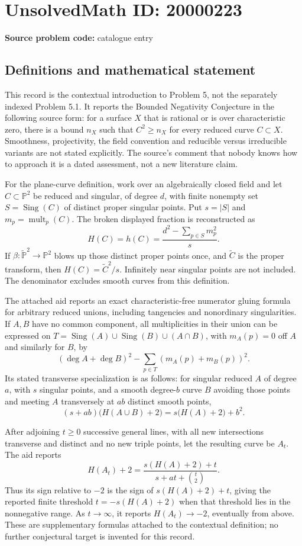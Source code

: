 \documentclass[11pt]{article}
\newcommand{\PP}{\mathbb{P}}
\begin{document}
\section*{UnsolvedMath ID: 20000223}
\textbf{Source problem code:} catalogue entry
\subsection{Definitions and mathematical statement}
This record is the contextual introduction to Problem 5, not the separately indexed Problem 5.1. It reports the Bounded Negativity Conjecture in the following source form: for a surface \(X\) that is rational or is over characteristic zero, there is a bound \(n_X\) such that \(C^2\geq n_X\) for every reduced curve \(C\subset X\). Smoothness, projectivity, the field convention and reducible versus irreducible variants are not stated explicitly. The source's comment that nobody knows how to approach it is a dated assessment, not a new literature claim.

For the plane-curve definition, work over an algebraically closed field and let \(C\subset\PP^2\) be reduced and singular, of degree \(d\), with finite nonempty set \(S=\operatorname{Sing}(C)\) of distinct proper singular points. Put \(s=|S|\) and \(m_p=\operatorname{mult}_p(C)\). The broken displayed fraction is reconstructed as
\[
H(C)=h(C)=\frac{d^2-\sum_{p\in S}m_p^2}{s}.
\]
If \(\beta:\widetilde{\PP}^2\to\PP^2\) blows up those distinct proper points once, and \(\widetilde C\) is the proper transform, then \(H(C)=\widetilde C^2/s\). Infinitely near singular points are not included. The denominator excludes smooth curves from this definition.

The attached aid reports an exact characteristic-free numerator gluing formula for arbitrary reduced unions, including tangencies and nonordinary singularities. If \(A,B\) have no common component, all multiplicities in their union can be expressed on
\(T=\operatorname{Sing}(A)\cup\operatorname{Sing}(B)\cup(A\cap B)\), with \(m_A(p)=0\) off \(A\) and similarly for \(B\), by
\[
(\deg A+\deg B)^2-\sum_{p\in T}(m_A(p)+m_B(p))^2.
\]
Its stated transverse specialization is as follows: for singular reduced \(A\) of degree \(a\), with \(s\) singular points, and a smooth degree-\(b\) curve \(B\) avoiding those points and meeting \(A\) transversely at \(ab\) distinct smooth points,
\[
(s+ab)\bigl(H(A\cup B)+2\bigr)=s\bigl(H(A)+2\bigr)+b^2.
\]

After adjoining \(t\geq0\) successive general lines, with all new intersections transverse and distinct and no new triple points, let the resulting curve be \(A_t\). The aid reports
\[
H(A_t)+2=
\frac{s(H(A)+2)+t}{s+at+\binom t2}.
\]
Thus its sign relative to \(-2\) is the sign of \(s(H(A)+2)+t\), giving the reported finite threshold \(t=-s(H(A)+2)\) when that threshold lies in the nonnegative range. As \(t\to\infty\), it reports \(H(A_t)\to-2\), eventually from above. These are supplementary formulas attached to the contextual definition; no further conjectural target is invented for this record.
\end{document}
